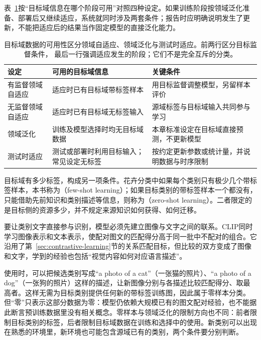 表~\ref{tab:domain-transfer-settings}按“目标域信息在哪个阶段可用”对照四种设定。如果训练阶段按领域泛化准备、部署后又继续适应，系统就同时涉及两套条件；报告时应明确说明发生了更新，不能把适应后的结果当作固定模型的直接泛化能力。

\begin{table}[htbp]
  \centering
  \small
  \begin{tabularx}{\linewidth}{@{}lXX@{}}
    \toprule
    \textbf{设定} & \textbf{可用的目标域信息} & \textbf{关键条件} \\
    \midrule
    有监督领域自适应 & 适应时已有目标域带标签样本 & 用目标监督调整模型，另留样本评价 \\
    无监督领域自适应 & 适应时已有目标域无标签输入 & 源域标签与目标域输入共同参与学习 \\
    领域泛化 & 训练及模型选择时均无目标域数据 & 本章标准设定在目标域直接预测，不更新模型 \\
    测试时适应 & 测试或部署时利用目标输入；常见设定无标签 & 按约定更新参数或统计量，并说明数据与时序限制 \\
    \bottomrule
  \end{tabularx}
  \caption{目标域数据的可用性区分领域自适应、领域泛化与测试时适应。前两行区分目标监督条件，
  最后一行强调适应发生的阶段；它们不是完全互斥的分类。}
  \label{tab:domain-transfer-settings}
\end{table}

目标域有多少标签，构成另一项条件。花卉分类中如果每个类别只有极少几个带标签样本，本书称为（few-shot learning）；如果目标类别的带标签样本一个都没有，只能借助先前知识和类别描述等信息，则称为（zero-shot learning）。二者限定的是目标侧的资源多少，并不规定来源知识如何获得、如何迁移。

要让类别文字直接参与识别，模型必须先建立图像与文字之间的联系。CLIP同时学习图像表示和文本表示，使配对图文的匹配得分高于同一批中不配对的组合。它沿用了第~\ref{sec:contrastive-learning}节的关系匹配目标，但比较的双方变成了图像和文字，学到的经验也包括“视觉内容如何对应语言描述”。

使用时，可以把候选类别写成“a photo of a cat”（一张猫的照片）、“a photo of a dog”（一张狗的照片）这样的描述，让新图像分别与各描述比较匹配得分、取最高者。这样无需为目标类别提供任何新的带标签训练图，因此属于零样本分类。但“零”只表示这部分数据为零：模型仍依赖大规模已有的图文配对经验，也不能据此断言预训练数据里没有相关概念。零样本与领域泛化的限制方向也不同：前者限制目标类别的标签，后者限制目标域数据在训练和选择中的使用。新类别可以出现在熟悉的环境里，新环境也可能包含源域已有的类别，两个条件要分别判断。

